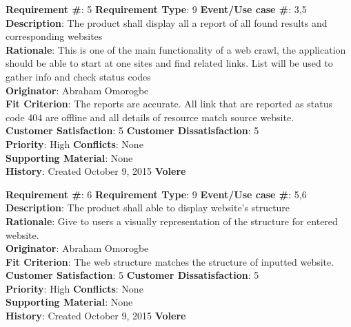 \documentclass[12pt]{article}
\begin{document}
\begin{framed}
\textbf{Requirement \#}: 5 \hfill \textbf{Requirement Type}: 9 \hfill\textbf{Event/Use case \#}: 3,5 \hfill\\
\textbf{Description}:  The product shall display all a report of all found results and corresponding websites\\
\textbf{Rationale}: This is one of the main functionality of a web crawl, the application should be able to start at one sites and find related links. List will be used to gather info and check status codes	\\
\textbf{Originator}: Abraham Omorogbe\\
\textbf{Fit Criterion}: The reports are accurate. All link that are reported as status code 404 are offline and all details of resource match source website.\\
\textbf{Customer Satisfaction}: 5 \hfill 	\textbf{Customer Dissatisfaction}: 5 \hfill\\
\textbf{Priority}: High \hfill \textbf{Conflicts}: None \hfill 		\\
\textbf{Supporting Material}: None\\
\textbf{History}: Created October 9, 2015 \hfill	 \textbf{Volere}\hfill

\end{framed}

\begin{framed}
\textbf{Requirement \#}: 6 \hfill \textbf{Requirement Type}: 9 \hfill\textbf{Event/Use case \#}: 5,6 \hfill\\
\textbf{Description}:  The product shall able to display website’s structure\\
\textbf{Rationale}: Give to users a visually representation of the structure for entered website.\\
\textbf{Originator}: Abraham Omorogbe\\
\textbf{Fit Criterion}: The web structure matches the structure of inputted website.	\\
\textbf{Customer Satisfaction}: 5 \hfill 	\textbf{Customer Dissatisfaction}: 5 \hfill\\
\textbf{Priority}: High \hfill \textbf{Conflicts}: None \hfill 		\\
\textbf{Supporting Material}: None\\
\textbf{History}: Created October 9, 2015 \hfill	 \textbf{Volere}\hfill

\end{framed}
\end{document}
